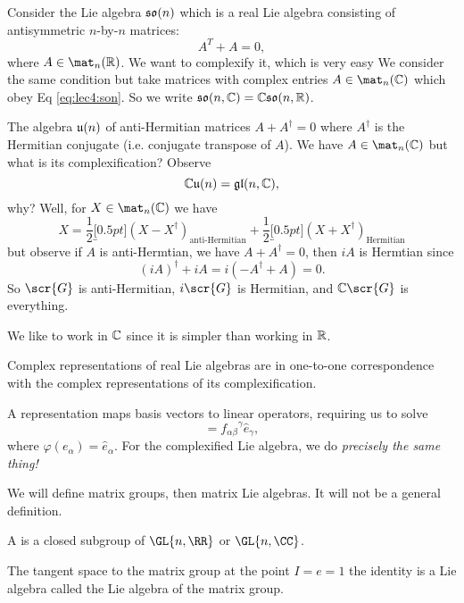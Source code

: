 \begin{ex}
Consider the Lie algebra $\frak{so}(n)$ which is a real Lie
algebra consisting of antisymmetric $n$-by-$n$ matrices:
\begin{equation}\label{eq:lec4:son}
A^{T}+A=0,
\end{equation}
where $A\in\mat_{n}(\Bbb{R})$. We want to complexify it, which is
very easy We consider the same condition but take matrices with
complex entries $A\in\mat_{n}(\Bbb{C})$ which obey Eq \eqref{eq:lec4:son}.
So we write $\frak{so}(n,\Bbb{C})=\Bbb{C}\frak{so}(n,\Bbb{R})$.
\end{ex}
\begin{ex}
The algebra $\frak{u}(n)$ of anti-Hermitian matrices $A+A^{\dagger}=0$
where $A^{\dagger}$ is the Hermitian conjugate (i.e. conjugate
transpose of $A$). We have $A\in\mat_{n}(\Bbb{C})$ but what is
its complexification? Observe
\begin{equation}
\Bbb{C}\frak{u}(n)=\frak{gl}(n,\Bbb{C}),
\end{equation}
why? Well, for $X\in\mat_{n}(\Bbb{C})$ we have
\begin{equation}
X = \frac{1}{2}\underbracket[0.5pt]{(X-X^{\dagger})}_{\text{anti-Hermitian}}+\frac{1}{2}\underbracket[0.5pt]{(X+X^{\dagger})}_{\text{Hermitian}}
\end{equation}
but observe if $A$ is anti-Hermtian, we have $A+A^{\dagger}=0$,
then $iA$ is Hermtian since
\begin{equation}
(iA)^{\dagger}+iA=i(-A^{\dagger}+A)=0.
\end{equation}
So $\scr{G}$ is anti-Hermitian, $i\scr{G}$ is Hermitian, and
$\Bbb{C}\scr{G}$ is everything.
\end{ex}

We like to work in $\Bbb{C}$ since it is simpler than working in $\Bbb{R}$.

\begin{thm}
Complex representations of real Lie algebras are in one-to-one
correspondence with the complex representations of its complexification.
\end{thm}
A representation maps basis vectors to linear operators,
requiring us to solve
\begin{equation}
[\widehat{e}_{\alpha},\widehat{e}_{\beta}]={f_{\alpha\beta}}^{\gamma}\widehat{e}_{\gamma},
\end{equation}
where $\varphi(e_{\alpha})=\widehat{e}_{\alpha}$. For the
complexified Lie algebra, we do \emph{precisely the same thing!}

We will define matrix groups, then matrix Lie algebras. It will
not be a general definition.
\begin{defn}
A  is a closed subgroup of $\GL{n,\RR}$
or $\GL{n,\CC}$.
\end{defn}
\begin{thm}
The tangent space to the matrix group at the point $I=e=1$ the
identity is a Lie algebra called the Lie algebra of the matrix group.
\end{thm}

